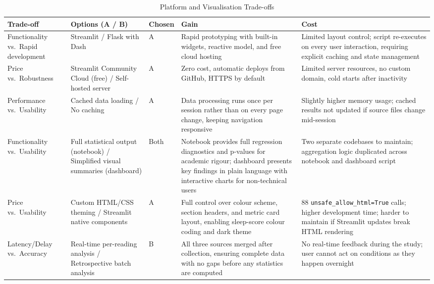 \documentclass[10pt,a4paper]{extarticle}
\begin{document}
\begin{table}[H]
\centering
\caption{Platform and Visualisation Trade-offs}
\label{tab:tradeoffs-vis}
\scriptsize
\setlength{\tabcolsep}{4pt}
\begin{tabular}{@{} p{2cm} p{2.8cm} >{\centering\arraybackslash}p{0.8cm} p{5.6cm} p{5.2cm} @{}}
\toprule
\textbf{Trade-off} & \textbf{Options (A / B)} & \textbf{Chosen} & \textbf{Gain} & \textbf{Cost} \\
\midrule
Functionality vs.\ Rapid development & Streamlit / Flask with Dash & A & Rapid prototyping with built-in widgets, reactive model, and free cloud hosting & Limited layout control; script re-executes on every user interaction, requiring explicit caching and state management \\[4pt]
\midrule
Price vs.\ Robustness & Streamlit Community Cloud (free) / Self-hosted server & A & Zero cost, automatic deploys from GitHub, HTTPS by default & Limited server resources, no custom domain, cold starts after inactivity \\[4pt]
\midrule
Performance vs.\ Usability & Cached data loading / No caching & A & Data processing runs once per session rather than on every page change, keeping navigation responsive & Slightly higher memory usage; cached results not updated if source files change mid-session \\[4pt]
\midrule
Functionality vs.\ Usability & Full statistical output (notebook) / Simplified visual summaries (dashboard) & Both & Notebook provides full regression diagnostics and p-values for academic rigour; dashboard presents key findings in plain language with interactive charts for non-technical users & Two separate codebases to maintain; aggregation logic duplicated across notebook and dashboard script \\[4pt]
\midrule
Price vs.\ Usability & Custom HTML/CSS theming / Streamlit native components & A & Full control over colour scheme, section headers, and metric card layout, enabling sleep-score colour coding and dark theme & 88 \texttt{unsafe\_allow\_html=True} calls; higher development time; harder to maintain if Streamlit updates break HTML rendering \\[4pt]
\midrule
Latency/Delay vs.\ Accuracy & Real-time per-reading analysis / Retrospective batch analysis & B & All three sources merged after collection, ensuring complete data with no gaps before any statistics are computed & No real-time feedback during the study; user cannot act on conditions as they happen overnight \\
\bottomrule
\end{tabular}
\end{table}
\end{document}
